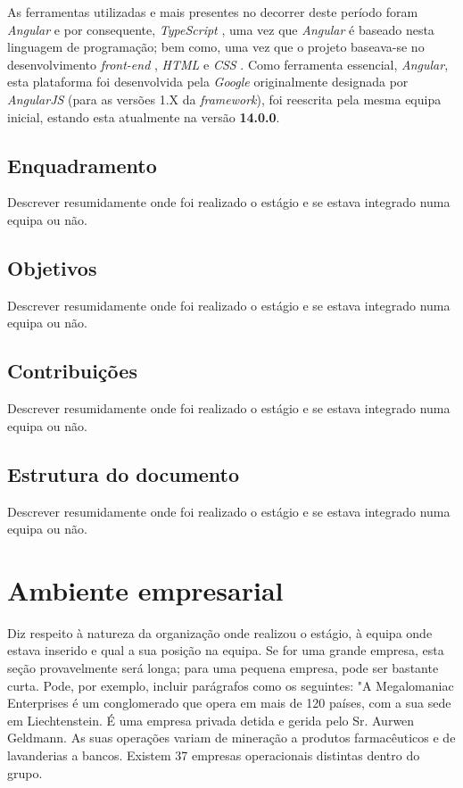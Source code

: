 \documentclass{article}
\begin{document}
\hspace*{0.5cm} As ferramentas utilizadas e mais presentes no decorrer deste período foram \emph{Angular} \cite{angular, angular-wiki, angular-docs, angular-repo} e por consequente, \emph{TypeScript} \cite{ts, ts-docs}, uma vez que \emph{Angular} é baseado nesta linguagem de programação; bem como, uma vez que o projeto baseava-se no desenvolvimento \emph{front-end} \cite{frontend}, \emph{HTML} \cite{html-article, html-wiki} e \emph{CSS} \cite{css}. \newline
\hspace*{0.5cm} Como ferramenta essencial, \emph{Angular}, esta plataforma foi desenvolvida pela \emph{Google} \cite{google} originalmente designada por \emph{AngularJS} \cite{old-angular} (para as versões 1.X da \emph{framework}), foi reescrita pela mesma equipa inicial, estando esta atualmente na versão \textbf{14.0.0}.

\subsection{Enquadramento}
Descrever resumidamente onde foi realizado o estágio e se estava integrado numa equipa ou não.

\subsection{Objetivos}
Descrever resumidamente onde foi realizado o estágio e se estava integrado numa equipa ou não.

\subsection{Contribuições}
Descrever resumidamente onde foi realizado o estágio e se estava integrado numa equipa ou não.

\subsection{Estrutura do documento}
Descrever resumidamente onde foi realizado o estágio e se estava integrado numa equipa ou não.

\cleardoublepage
\section{Ambiente empresarial}
Diz respeito à natureza da organização onde realizou o estágio, à equipa onde estava inserido e qual a sua posição na equipa. Se for uma grande empresa, esta seção provavelmente será longa; para uma pequena empresa, pode ser bastante curta. Pode, por exemplo, incluir parágrafos como os seguintes:
"A Megalomaniac Enterprises é um conglomerado que opera em mais de 120 países, com a sua sede em Liechtenstein. É uma empresa privada detida e gerida pelo Sr. Aurwen Geldmann. As suas operações variam de mineração a produtos farmacêuticos e de lavanderias a bancos. Existem 37 empresas operacionais distintas dentro do grupo.
\end{document}
